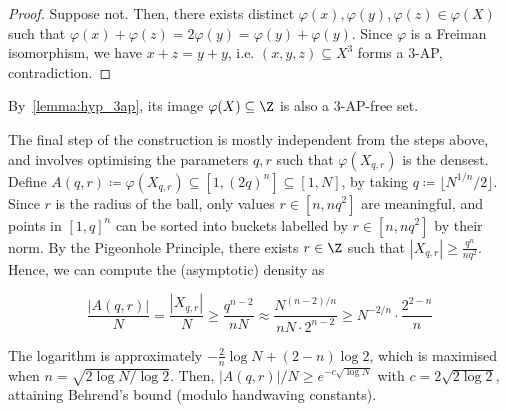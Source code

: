 \begin{proof}
  Suppose not. Then, there exists distinct \(\varphi(x), \varphi(y), \varphi(z) \in \varphi(X)\) such that \(\varphi(x) + \varphi(z) = 2\varphi(y) = \varphi(y) + \varphi(y)\). Since \(\varphi\) is a Freiman isomorphism, we have \(x + z = y + y\), i.e. \((x, y, z) \subseteq X^3\) forms a \(3\)-AP, contradiction.
\end{proof}

By~\cref{lemma:hyp_3ap}, its image \(\varphi(X) \subseteq \Z\) is also a \(3\)-AP-free set.

The final step of the construction is mostly independent from the steps above, and involves optimising the parameters \(q, r\) such that \(\varphi(X_{q, r})\) is the densest. Define \(A(q, r) \coloneqq \varphi(X_{q, r}) \subseteq [1, (2q)^n] \subseteq [1, N]\), by taking \(q \coloneqq \lfloor N^{1 / n} / 2 \rfloor\). Since \(r\) is the radius of the ball, only values \(r \in [n, nq^2]\) are meaningful, and points in \([1, q]^n\) can be sorted into buckets labelled by \(r \in [n, nq^2]\) by their norm. By the Pigeonhole Principle, there exists \(r \in \Z\) such that \(|X_{q, r}| \geq \frac{q^n}{nq^2}\). Hence, we can compute the (asymptotic) density as

\[
  \frac{|A(q, r)|}{N} = \frac{|X_{q, r}|}{N} \geq \frac{q^{n - 2}}{nN} \approx \frac{N^{(n - 2) / n}}{nN \cdot 2^{n - 2}} \geq N^{-2 / n} \cdot \frac{2^{2 - n}}{n}
\]

The logarithm is approximately \(-\frac{2}{n}\log N + (2 - n)\log 2\), which is maximised when \(n = \sqrt{2\log N / \log 2}\). Then, \(|A(q, r)| / N \geq e^{-c\sqrt{\log N}}\) with \(c = 2\sqrt{2\log 2}\), attaining Behrend's bound (modulo handwaving constants).
